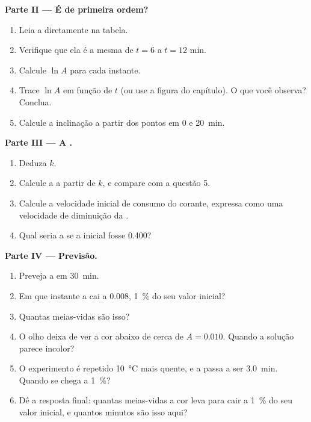 \begin{problem}
\medskip
\noindent\textbf{Parte II --- É de primeira ordem?}
\begin{enumerate}[resume]
  \item Leia a  diretamente na tabela.
  \item Verifique que ela é a mesma de $t = 6$ a $t = 12$ min.
  \item Calcule $\ln A$ para cada instante.
  \item Trace $\ln A$ em função de $t$ (ou use a figura do capítulo). O
        que você observa? Conclua.
  \item Calcule a inclinação a partir dos pontos em 0 e \qty{20}{min}.
\end{enumerate}

\medskip
\noindent\textbf{Parte III --- A .}
\begin{enumerate}[resume]
  \item Deduza $k$.
  \item Calcule a  a partir de $k$, e compare com a questão 5.
  \item Calcule a velocidade inicial de consumo do corante, expressa
        como uma velocidade de diminuição da .
  \item Qual seria a  se a  inicial fosse 0.400?
\end{enumerate}

\medskip
\noindent\textbf{Parte IV --- Previsão.}
\begin{enumerate}[resume]
  \item Preveja a  em \qty{30}{min}.
  \item Em que instante a  cai a 0.008, \qty{1}{\percent} do
        seu valor inicial?
  \item Quantas meias-vidas são isso?
  \item O olho deixa de ver a cor abaixo de cerca de $A = 0.010$. Quando
        a solução parece incolor?
  \item O experimento é repetido \qty{10}{\celsius} mais quente, e a
         passa a ser \qty{3.0}{min}. Quando se chega a
        \qty{1}{\percent}?
  \item Dê a resposta final: quantas meias-vidas a cor leva para cair a
        \qty{1}{\percent} do seu valor inicial, e quantos minutos são
        isso aqui?
\end{enumerate}
\end{problem}
